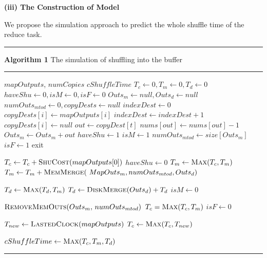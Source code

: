 \noindent\textbf{(iii) The Construction of Model}

We propose the simulation approach to predict the whole shuffle time of the reduce task. 

\noindent\rule{3.5in}{0.6mm}
\textbf{Algorithm 1} The simulation of shuffling into the buffer
\rule{3.5in}{0.3mm}
\begin{algorithmic}[1]
\Require $mapOutputs$, $numCopies$
\Ensure $cShuffleTime$
\State $T_c \gets 0,  T_m \gets 0, T_d \gets 0$
\State $haveShu\gets 0, isM \gets 0, isF \gets 0 $
\State $Outs_m \gets null, Outs_d \gets null $
\State $numOuts_{mtod} \gets 0, copyDests \gets null $
\State $indexDest \gets 0$
\State $copyDests[i] \gets mapOutputs[i]$
\State $indexDest \gets indexDest + 1$
\Else
\State $copyDests[i] \gets null$
\EndIf
\EndFor
{}
\State $out \gets copyDest[t] $
\State $nums[out] \gets nums[out] - 1$
\State $Outs_m \gets Outs_m + out$
\State $haveShu \gets 1$
\State $isM \gets 1$
\State $numOuts_{mtod} \gets size[Outs_m]$
\EndIf
{}
\State {}
\EndIf
{}
\State $isF \gets 1$
\State exit
\EndIf

\EndIf
\EndFor
{}
\State $T_c \gets T_c + \Call{ShuCost}{mapOutputs[0]}$
\State $haveShu \gets 0$
\State $T_m \gets \Call{Max}{T_c, T_m}$
\State $T_m \gets T_m + \Call{MemMerge}{$
$MapOuts_m, numOuts_{mtod}, Outs_d}$

\State $T_d \gets \Call{Max}{T_d, T_m}$
\State $T_d \gets \Call{DiskMerge}{Outs_d} + T_d$
\EndIf
\State $isM \gets 0$
\EndIf

\State $\Call{RemoveMemOuts}{Outs_m, $
$numOuts_{mtod}}$
\State $T_c = \Call{Max}{T_c, T_m}$
 \State $isF \gets 0$
\EndIf

\Else
\State $T_{new} \gets \Call{LastedClock}{mapOutputs}$
\State $T_c \gets \Call{Max}{T_c, T_{new}}$
\EndIf

\EndWhile
\State $cShuffleTime \gets \Call{Max}{T_c, T_m, T_d}$
\EndFunction
\end{algorithmic}
\noindent\rule{3.5in}{0.6mm}

